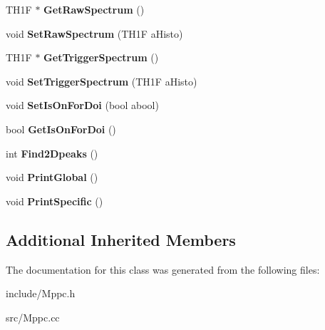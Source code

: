 \begin{DoxyCompactItemize}
\item 
\hypertarget{classMppc_aeeed71effe5210a9fe5ea4086dd99c6d}{T\+H1\+F $\ast$ {\bfseries Get\+Raw\+Spectrum} ()}\label{classMppc_aeeed71effe5210a9fe5ea4086dd99c6d}

\item 
\hypertarget{classMppc_a05ae0e638488d7ca7a2a7e8c223c7672}{void {\bfseries Set\+Raw\+Spectrum} (T\+H1\+F a\+Histo)}\label{classMppc_a05ae0e638488d7ca7a2a7e8c223c7672}

\item 
\hypertarget{classMppc_a829b437d3969c69f64b36f5ef5622017}{T\+H1\+F $\ast$ {\bfseries Get\+Trigger\+Spectrum} ()}\label{classMppc_a829b437d3969c69f64b36f5ef5622017}

\item 
\hypertarget{classMppc_acf55cba4b46c96dc4d80a9bbf565fe5b}{void {\bfseries Set\+Trigger\+Spectrum} (T\+H1\+F a\+Histo)}\label{classMppc_acf55cba4b46c96dc4d80a9bbf565fe5b}

\item 
\hypertarget{classMppc_a8796833b3eed967559c06608fa9c4bd2}{void {\bfseries Set\+Is\+On\+For\+Doi} (bool abool)}\label{classMppc_a8796833b3eed967559c06608fa9c4bd2}

\item 
\hypertarget{classMppc_a9cfa11f6573aba4e60b46486a4432825}{bool {\bfseries Get\+Is\+On\+For\+Doi} ()}\label{classMppc_a9cfa11f6573aba4e60b46486a4432825}

\item 
\hypertarget{classMppc_ac328d7b2056d789d6fc5d2d7fad40a46}{int {\bfseries Find2\+Dpeaks} ()}\label{classMppc_ac328d7b2056d789d6fc5d2d7fad40a46}

\item 
\hypertarget{classMppc_ac9ee63497a9c7d0fce0c8a03f6f337dd}{void {\bfseries Print\+Global} ()}\label{classMppc_ac9ee63497a9c7d0fce0c8a03f6f337dd}

\item 
\hypertarget{classMppc_aab23e14995583c428c4cce1879936601}{void {\bfseries Print\+Specific} ()}\label{classMppc_aab23e14995583c428c4cce1879936601}

\end{DoxyCompactItemize}
\subsection*{Additional Inherited Members}


The documentation for this class was generated from the following files\+:\begin{DoxyCompactItemize}
\item 
include/Mppc.\+h\item 
src/Mppc.\+cc\end{DoxyCompactItemize}
